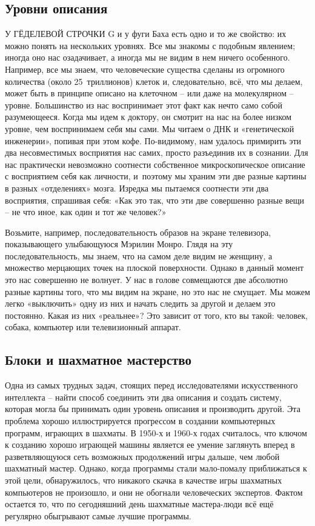 \documentclass[../main.tex]{subfiles}
\begin{document}

\subsection{Уровни описания}

У ГЁДЕЛЕВОЙ СТРОЧКИ G и у фуги Баха есть одно и то же свойство: их можно понять на нескольких уровнях. Все мы знакомы с подобным явлением; иногда оно нас озадачивает, а иногда мы не видим в нем ничего особенного. Например, все мы знаем, что человеческие существа сделаны из огромного количества (около 25~триллионов) клеток и, следовательно, всё, что мы делаем, может быть в принципе описано на клеточном \--- или даже на молекулярном \--- уровне. Большинство из нас воспринимает этот факт как нечто само собой разумеющееся. Когда мы идем к доктору, он смотрит на нас на более низком уровне, чем воспринимаем себя мы сами. Мы читаем о ДНК и «генетической инженерии», попивая при этом кофе. По-видимому, нам удалось примирить эти два несовместимых восприятия нас самих, просто разъединив их в сознании. Для нас практически невозможно соотнести собственное микроскопическое описание с восприятием себя как личности, и~поэтому мы храним эти две разные картины в разных «отделениях» мозга. Изредка мы пытаемся соотнести эти два восприятия, спрашивая себя: «Как это так, что эти две совершенно разные вещи \--- не что иное, как один и тот же человек?»

Возьмите, например, последовательность образов на экране телевизора, показывающего улыбающуюся Мэрилин Монро. Глядя на эту последовательность, мы знаем, что на самом деле видим не женщину, а множество мерцающих точек на плоской поверхности. Однако в данный момент это нас совершенно не волнует. У нас в голове совмещаются две абсолютно разные картины того, что мы видим на экране, но это нас не смущает. Мы можем легко «выключить» одну из них и начать следить за другой и делаем это постоянно. Какая из них «реальнее»? Это зависит от того, кто вы такой: человек, собака, компьютер или телевизионный аппарат.


\subsection{Блоки и шахматное мастерство}

Одна из самых трудных задач, стоящих перед исследователями искусственного интеллекта \--- найти способ соединить эти два описания и создать систему, которая могла бы принимать один уровень описания и производить другой. Эта проблема хорошо иллюстрируется прогрессом в создании компьютерных программ, играющих в шахматы. В 1950-х и 1960-х годах считалось, что ключом к созданию хорошо играющей машины является ее умение заглянуть вперед в разветвляющуюся сеть возможных продолжений игры дальше, чем любой шахматный мастер. Однако, когда программы стали мало-помалу приближаться к этой цели, обнаружилось, что никакого скачка в качестве игры шахматных компьютеров не произошло, и они не обогнали человеческих экспертов. Фактом остается то, что по сегодняшний день шахматные мастера-люди всё ещё регулярно обыгрывают самые лучшие программы.
\end{document}
